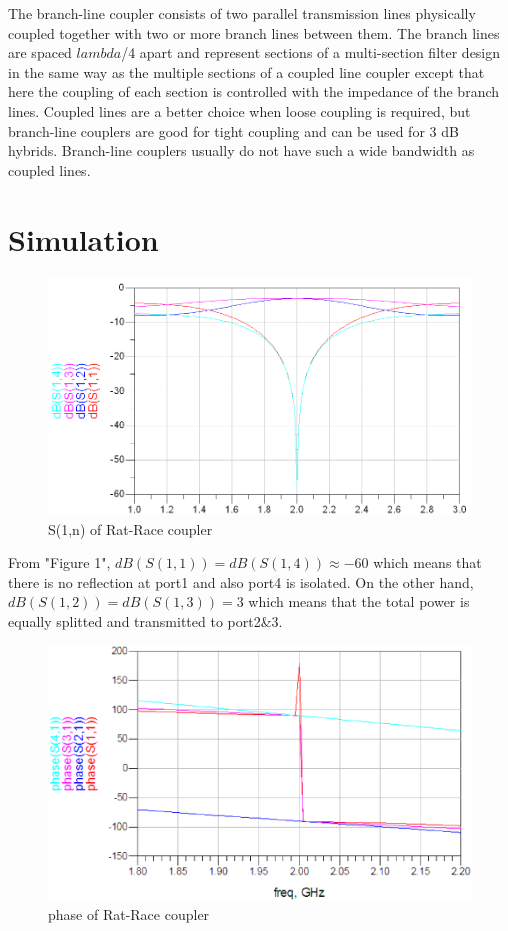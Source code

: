 \documentclass[11pt,a4paper]{report}
\begin{document}
The branch-line coupler consists of two parallel transmission lines physically coupled together with two or more branch lines between them. The branch lines are spaced \(lambda\)/4 apart and represent sections of a multi-section filter design in the same way as the multiple sections of a coupled line coupler except that here the coupling of each section is controlled with the impedance of the branch lines. Coupled lines are a better choice when loose coupling is required, but branch-line couplers are good for tight coupling and can be used for 3 dB hybrids. Branch-line couplers usually do not have such a wide bandwidth as coupled lines. \\

\section*{Simulation}

\begin{figure}
\centering
\includegraphics[width=1\textwidth]{2.2.png}
\caption{S(1,n) of Rat-Race coupler}
\end{figure}

From "Figure 1", \(dB(S(1,1)) = dB(S(1,4)) \approx -60\) which means that there is no reflection at port1 and also port4 is isolated. On the other hand, \(dB(S(1,2)) = dB(S(1,3)) = 3\) which means that the total power is equally splitted and transmitted to port2\&3. \\

\begin{figure}
\centering
\includegraphics[width=\textwidth]{rat-race-phase.eps}
\caption{phase of Rat-Race coupler}
\end{figure}
\end{document}

